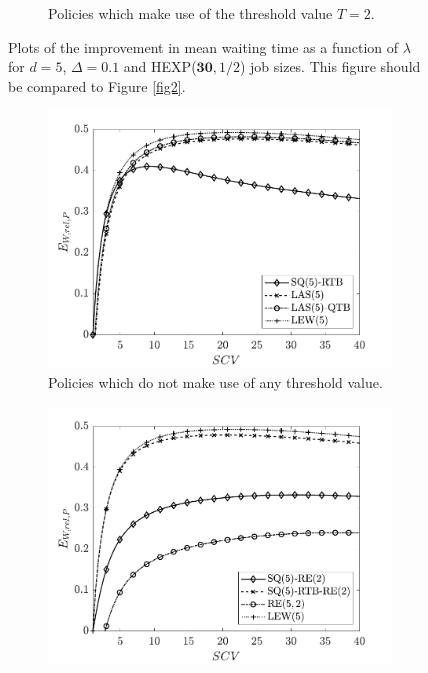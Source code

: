\documentclass[12pt]{report}
\begin{document}
\begin{figure}[t]
\begin{center}
\begin{subfigure}{.43\textwidth}
\caption{Policies which make use of the threshold value $T=2$.}
\label{fig3b}
\end{subfigure}
\caption{Plots of the improvement in mean waiting time as a function of $\lambda$ for $d=5$, $\Delta=0.1$ and HEXP($\textbf{30},1/2$) job sizes. This figure should be compared to Figure \ref{fig2}.}
\label{fig3}
\end{center}
\end{figure}
\begin{figure}[t]
\begin{center}
\begin{subfigure}{0.43\textwidth}
\centering
\captionsetup{width=.8\linewidth}
\includegraphics[width=1\linewidth]{figures/Chapter7/fig7a.pdf}
\caption{Policies which do not make use of any threshold value.}
\label{fig4a}
\end{subfigure}
\begin{subfigure}{.43\textwidth}
\centering
\captionsetup{width=.8\linewidth}
\includegraphics[width=1\linewidth]{figures/Chapter7/fig7b.pdf}

\end{subfigure}
\end{center}
\end{figure}
\end{document}
